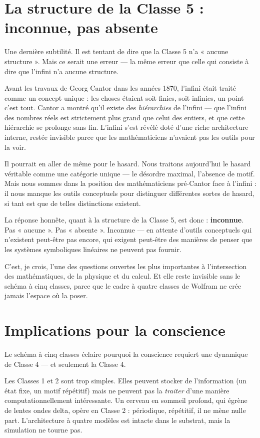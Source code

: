 \documentclass[11pt, twoside, openright]{book}
\begin{document}
\section*{La structure de la Classe 5 : inconnue, pas absente}

Une dernière subtilité. Il est tentant de dire que la Classe 5 n'a « aucune structure ». Mais ce serait une erreur --- la même erreur que celle qui consiste à dire que l'infini n'a aucune structure.

Avant les travaux de Georg Cantor dans les années 1870, l'infini était traité comme un concept unique : les choses étaient soit finies, soit infinies, un point c'est tout. Cantor a montré qu'il existe des \textit{hiérarchies} de l'infini --- que l'infini des nombres réels est strictement plus grand que celui des entiers, et que cette hiérarchie se prolonge sans fin. L'infini s'est révélé doté d'une riche architecture interne, restée invisible parce que les mathématiciens n'avaient pas les outils pour la voir.

Il pourrait en aller de même pour le hasard. Nous traitons aujourd'hui le hasard véritable comme une catégorie unique --- le désordre maximal, l'absence de motif. Mais nous sommes dans la position des mathématiciens pré-Cantor face à l'infini : il nous manque les outils conceptuels pour distinguer différentes sortes de hasard, si tant est que de telles distinctions existent.

La réponse honnête, quant à la structure de la Classe 5, est donc : \textbf{inconnue}. Pas « aucune ». Pas « absente ». Inconnue --- en attente d'outils conceptuels qui n'existent peut-être pas encore, qui exigent peut-être des manières de penser que les systèmes symboliques linéaires ne peuvent pas fournir.

C'est, je crois, l'une des questions ouvertes les plus importantes à l'intersection des mathématiques, de la physique et du calcul. Et elle reste invisible sans le schéma à cinq classes, parce que le cadre à quatre classes de Wolfram ne crée jamais l'espace où la poser.

\section*{Implications pour la conscience}

Le schéma à cinq classes éclaire pourquoi la conscience requiert une dynamique de Classe 4 --- et seulement la Classe 4.

Les Classes 1 et 2 sont trop simples. Elles peuvent stocker de l'information (un état fixe, un motif répétitif) mais ne peuvent pas la \textit{traiter} d'une manière computationnellement intéressante. Un cerveau en sommeil profond, qui égrène de lentes ondes delta, opère en Classe 2 : périodique, répétitif, il ne mène nulle part. L'architecture à quatre modèles est intacte dans le substrat, mais la simulation ne tourne pas.
\end{document}
